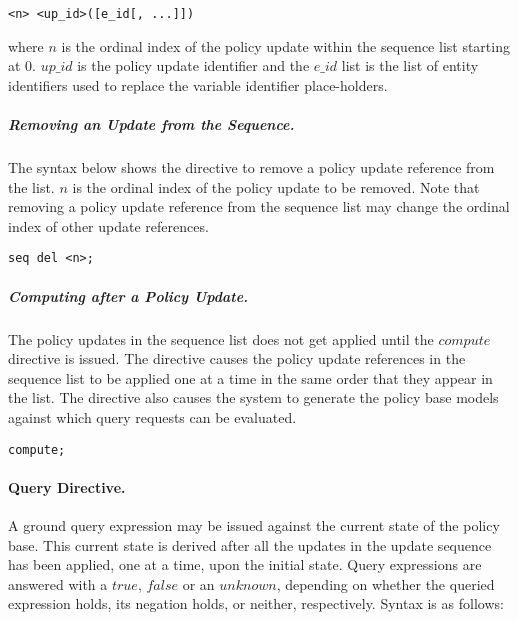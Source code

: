\documentclass[10pt, twocolumn]{article}
\begin{document}
          \begin{verbatim}<n> <up_id>([e_id[, ...]])\end{verbatim}

          \noindent where $n$ is the ordinal index of the policy update within
          the sequence list starting at 0. $up\_id$ is the policy update
          identifier and the $e\_id$ list is the list of entity identifiers
          used to replace the variable identifier place-holders.

        \subparagraph{Removing an Update from the Sequence.}
          The syntax below shows the directive to remove a policy update
          reference from the list. $n$ is the ordinal index of the policy
          update to be removed. Note that removing a policy update reference
          from the sequence list may change the ordinal index of other update
          references.

          \begin{verbatim}seq del <n>;\end{verbatim}

        \subparagraph{Computing after a Policy Update.}

          The policy updates in the sequence list does not get applied until
          the $compute$ directive is issued. The directive causes the policy
          update references in the sequence list to be applied one at a time in
          the same order that they appear in the list. The directive also
          causes the system to generate the policy base models against which
          query requests can be evaluated.

          \begin{verbatim}compute;\end{verbatim}

        \paragraph{Query Directive.}

          A ground query expression may be issued against the current state of
          the policy base. This current state is derived after all the updates
          in the update sequence has been applied, one at a time, upon the
          initial state. Query expressions are answered with a $true$, $false$
          or an $unknown$, depending on whether the queried expression holds,
          its negation holds, or neither, respectively. Syntax is as follows:
\end{document}
